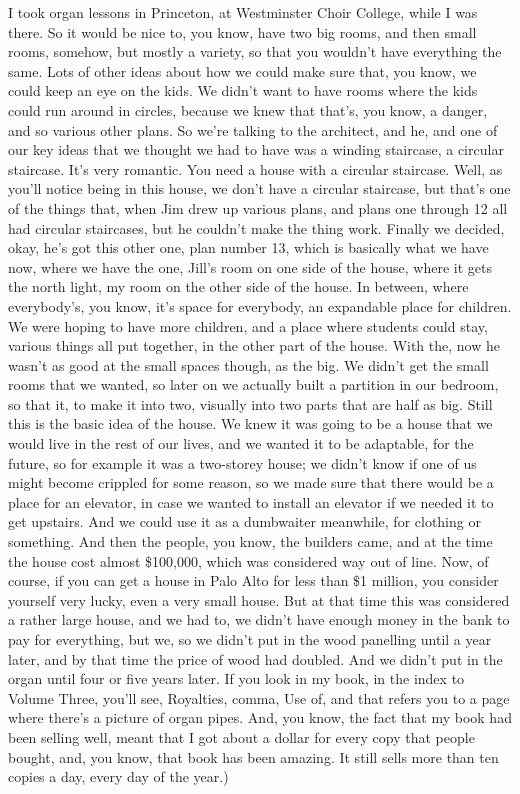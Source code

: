\documentclass[]{article}
\begin{document}
I took organ lessons in Princeton, at Westminster Choir College, while I
was there. So it would be nice to, you know, have two big rooms, and
then small rooms, somehow, but mostly a variety, so that you wouldn't
have everything the same. Lots of other ideas about how we could make
sure that, you know, we could keep an eye on the kids. We didn't want to
have rooms where the kids could run around in circles, because we knew
that that's, you know, a danger, and so various other plans. So we're
talking to the architect, and he, and one of our key ideas that we
thought we had to have was a winding staircase, a circular staircase.
It's very romantic. You need a house with a circular staircase. Well, as
you'll notice being in this house, we don't have a circular staircase,
but that's one of the things that, when Jim drew up various plans, and
plans one through 12 all had circular staircases, but he couldn't make
the thing work. Finally we decided, okay, he's got this other one, plan
number 13, which is basically what we have now, where we have the one,
Jill's room on one side of the house, where it gets the north light, my
room on the other side of the house. In between, where everybody's, you
know, it's space for everybody, an expandable place for children. We
were hoping to have more children, and a place where students could
stay, various things all put together, in the other part of the house.
With the, now he wasn't as good at the small spaces though, as the big.
We didn't get the small rooms that we wanted, so later on we actually
built a partition in our bedroom, so that it, to make it into two,
visually into two parts that are half as big. Still this is the basic
idea of the house. We knew it was going to be a house that we would live
in the rest of our lives, and we wanted it to be adaptable, for the
future, so for example it was a two-storey house; we didn't know if one
of us might become crippled for some reason, so we made sure that there
would be a place for an elevator, in case we wanted to install an
elevator if we needed it to get upstairs. And we could use it as a
dumbwaiter meanwhile, for clothing or something. And then the people,
you know, the builders came, and at the time the house cost almost
\$100,000, which was considered way out of line. Now, of course, if you
can get a house in Palo Alto for less than \$1 million, you consider
yourself very lucky, even a very small house. But at that time this was
considered a rather large house, and we had to, we didn't have enough
money in the bank to pay for everything, but we, so we didn't put in the
wood panelling until a year later, and by that time the price of wood
had doubled. And we didn't put in the organ until four or five years
later. If you look in my book, in the index to Volume Three, you'll see,
Royalties, comma, Use of, and that refers you to a page where there's a
picture of organ pipes. And, you know, the fact that my book had been
selling well, meant that I got about a dollar for every copy that people
bought, and, you know, that book has been amazing. It still sells more
than ten copies a day, every day of the year.)
\end{document}
